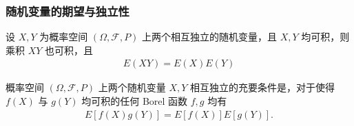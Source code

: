 	\begin{frame}
		\frametitle{随机变量的期望与独立性}
		\begin{thm}
			设 $X, Y$ 为概率空间 $(\Omega,\mathcal{F}, P)$ 上两个相互独立的随机变量，且 $X, Y$ 均可积，则乘积 $XY$ 也可积，且
			\begin{eqnarray*}
				E(XY)=E(X)E(Y)
			\end{eqnarray*}

		\end{thm}

		\pause
		\begin{thm}
			概率空间 $(\Omega,\mathcal{F}, P)$ 上两个随机变量 $X, Y$ 相互独立的充要条件是，对于使得 $f (X)$ 与 $g (Y)$ 均可积的任何 Borel 函数 $f,g$ 均有
			\begin{eqnarray*}
				E[f(X)g(Y)]=E[f(X)]E[g(Y)].
			\end{eqnarray*}

		\end{thm}



	\end{frame}


